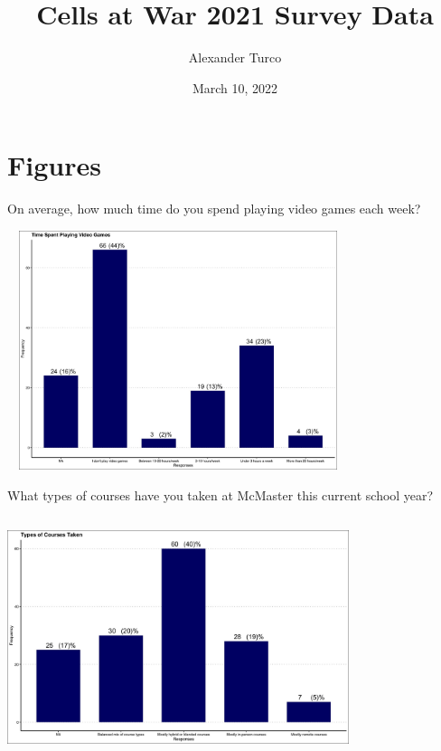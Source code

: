 \documentclass{beamer}
\title[BEAP Dec 2022]{Cells at War 2021 Survey Data }
\author{Alexander Turco}
\date{March 10, 2022}
\begin{document}
	
	\section{Figures}
	\begin{frame}
		\titlepage 
	\end{frame}
	
	
	\begin{frame}{On average, how much time do you spend playing video games each week?}
		
		\begin{center}
			\includegraphics[width=10cm, height=7cm]{figures/time_spent_playing_videogames.jpg}
		\end{center}
	
	\end{frame}

	\begin{frame}{What types of courses have you taken at McMaster this current school year?}
		
		\begin{center}
			\includegraphics[width=10cm, height=7cm]{figures/types_of_courses_taken.jpg}
		\end{center}
		
	\end{frame}
\end{document}
